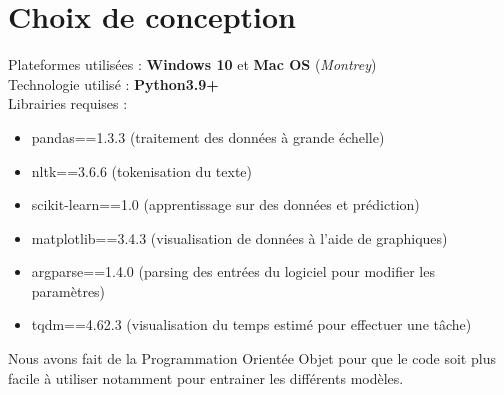 \section{Choix de conception}

Plateformes utilisées : \textbf{Windows 10} et \textbf{Mac OS} (\textit{Montrey}) \\
Technologie utilisé : \textbf{Python3.9+} \\
Librairies requises :
\begin{itemize}
    \item pandas==1.3.3 (traitement des données à grande échelle)
    \item nltk==3.6.6 (tokenisation du texte)
    \item scikit-learn==1.0 (apprentissage sur des données et prédiction)
    \item matplotlib==3.4.3 (visualisation de données à l’aide de graphiques)
    \item argparse==1.4.0 (parsing des entrées du logiciel pour modifier les paramètres)
    \item tqdm==4.62.3 (visualisation du temps estimé pour effectuer une tâche)
\end{itemize}

Nous avons fait de la Programmation Orientée Objet pour que le code soit plus facile à utiliser notamment pour entrainer les différents modèles.